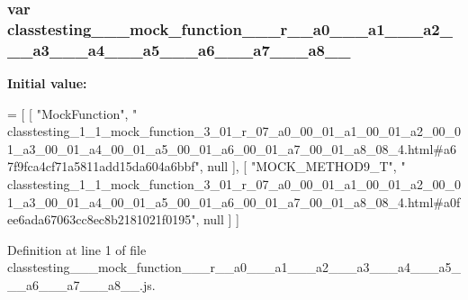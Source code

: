 \subsubsection[{\texorpdfstring{classtesting\+\_\+1\+\_\+1\+\_\+mock\+\_\+function\+\_\+3\+\_\+01\+\_\+r\+\_\+07\+\_\+a0\+\_\+00\+\_\+01\+\_\+a1\+\_\+00\+\_\+01\+\_\+a2\+\_\+00\+\_\+01\+\_\+a3\+\_\+00\+\_\+01\+\_\+a4\+\_\+00\+\_\+01\+\_\+a5\+\_\+00\+\_\+01\+\_\+a6\+\_\+00\+\_\+01\+\_\+a7\+\_\+00\+\_\+01\+\_\+a8\+\_\+08\+\_\+4}{classtesting_1_1_mock_function_3_01_r_07_a0_00_01_a1_00_01_a2_00_01_a3_00_01_a4_00_01_a5_00_01_a6_00_01_a7_00_01_a8_08_4}}]{\setlength{\rightskip}{0pt plus 5cm}var classtesting\+\_\+\_\+\_\+mock\+\_\+function\+\_\+\_\+\_\+r\+\_\+\_\+a0\+\_\+\_\+\_\+a1\+\_\+\_\+\_\+a2\+\_\+\_\+\_\+a3\+\_\+\_\+\_\+a4\+\_\+\_\+\_\+a5\+\_\+\_\+\_\+a6\+\_\+\_\+\_\+a7\+\_\+\_\+\_\+a8\+\_\+\_}\hypertarget{classtesting__1__1__mock__function__3__01__r__07__a0__00__01__a1__00__01__a2__00__01__a3__00__01a13665083ee7596e2aff34a8aa7ee447_a3576e88f03e82b0caeef1455e965d076}{}\label{classtesting__1__1__mock__function__3__01__r__07__a0__00__01__a1__00__01__a2__00__01__a3__00__01a13665083ee7596e2aff34a8aa7ee447_a3576e88f03e82b0caeef1455e965d076}
{\bfseries Initial value\+:}
\begin{DoxyCode}
=
[
    [ \textcolor{stringliteral}{"MockFunction"}, \textcolor{stringliteral}{"
      classtesting\_1\_1\_mock\_function\_3\_01\_r\_07\_a0\_00\_01\_a1\_00\_01\_a2\_00\_01\_a3\_00\_01\_a4\_00\_01\_a5\_00\_01\_a6\_00\_01\_a7\_00\_01\_a8\_08\_4.html#a67f9fca4cf71a5811add15da604a6bbf"}, null ],
    [ \textcolor{stringliteral}{"MOCK\_METHOD9\_T"}, \textcolor{stringliteral}{"
      classtesting\_1\_1\_mock\_function\_3\_01\_r\_07\_a0\_00\_01\_a1\_00\_01\_a2\_00\_01\_a3\_00\_01\_a4\_00\_01\_a5\_00\_01\_a6\_00\_01\_a7\_00\_01\_a8\_08\_4.html#a0fee6ada67063cc8ec8b2181021f0195"}, null ]
]
\end{DoxyCode}


Definition at line 1 of file classtesting\+\_\+\_\+\_\+mock\+\_\+function\+\_\+\_\+\_\+r\+\_\+\_\+a0\+\_\+\_\+\_\+a1\+\_\+\_\+\_\+a2\+\_\+\_\+\_\+a3\+\_\+\_\+\_\+a4\+\_\+\_\+\_\+a5\+\_\+\_\+\_\+a6\+\_\+\_\+\_\+a7\+\_\+\_\+\_\+a8\+\_\+\_.\+js.

